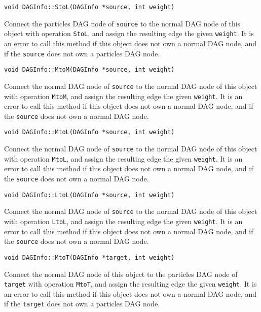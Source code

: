 \begin{lstlisting}
void DAGInfo::StoL(DAGInfo *source, int weight)
\end{lstlisting}

\noindent Connect the particles DAG node of \texttt{source} to the normal DAG
node of this object with operation \texttt{StoL}, and assign the resulting
edge the given \texttt{weight}. It is an error to call this method if this
object does not own a normal DAG node, and if the \texttt{source} does not
own a particles DAG node.

\begin{lstlisting}
void DAGInfo::MtoM(DAGInfo *source, int weight)
\end{lstlisting}

\noindent Connect the normal DAG node of \texttt{source} to the normal DAG
node of this object with operation \texttt{MtoM}, and assign the resulting
edge the given \texttt{weight}. It is an error to call this method if this
object does not own a normal DAG node, and if the \texttt{source} does not
own a normal DAG node.

\begin{lstlisting}
void DAGInfo::MtoL(DAGInfo *source, int weight)
\end{lstlisting}

\noindent Connect the normal DAG node of \texttt{source} to the normal DAG
node of this object with operation \texttt{MtoL}, and assign the resulting
edge the given \texttt{weight}. It is an error to call this method if this
object does not own a normal DAG node, and if the \texttt{source} does not
own a normal DAG node.

\begin{lstlisting}
void DAGInfo::LtoL(DAGInfo *source, int weight)
\end{lstlisting}

\noindent Connect the normal DAG node of \texttt{source} to the normal DAG
node of this object with operation \texttt{LtoL}, and assign the resulting
edge the given \texttt{weight}. It is an error to call this method if this
object does not own a normal DAG node, and if the \texttt{source} does not
own a normal DAG node.

\begin{lstlisting}
void DAGInfo::MtoT(DAGInfo *target, int weight)
\end{lstlisting}

\noindent Connect the normal DAG node of this object to the particles DAG
node of \texttt{target} with operation \texttt{MtoT}, and assign the
resulting edge the given \texttt{weight}. It is an error to call this method
if this object does not own a normal DAG node, and if the \texttt{target}
does not own a particles DAG node.

